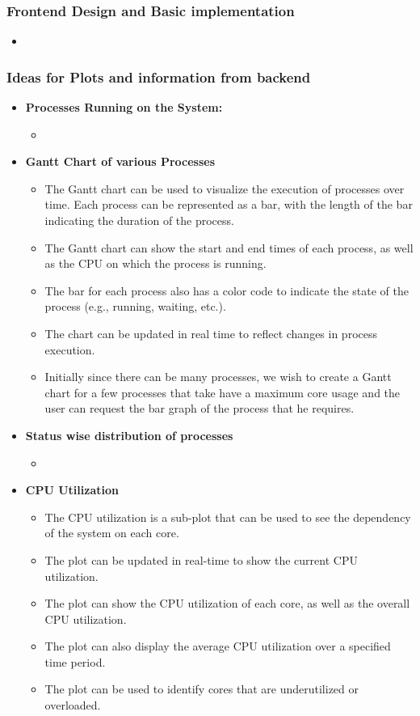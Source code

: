 \documentclass[12pt]{article}
\begin{document}
\subsubsection{Frontend Design and Basic implementation}
\begin{itemize}
    \item
\end{itemize}
\subsubsection{Ideas for Plots and information from backend}
\begin{itemize}
    \item {\bf Processes Running on the System:}
    \begin{itemize}
        \item
    \end{itemize}
    \item {\bf Gantt Chart of various Processes}
    \begin{itemize}
        \item The Gantt chart can be used to visualize the execution of processes over time. Each process can be represented as a bar, with the length of the bar indicating the duration of the process.
        \item The Gantt chart can show the start and end times of each process, as well as the CPU on which the process is running.
        \item The bar for each process also has a color code to indicate the state of the process (e.g., running, waiting, etc.).
        \item The chart can be updated in real time to reflect changes in process execution.
        \item Initially since there can be many processes, we wish to create a Gantt chart for a few processes that take have a maximum core usage and the user can request the bar graph of the process that he requires.
    \end{itemize}
    \item {\bf Status wise distribution of processes}
    \begin{itemize}
        \item
    \end{itemize}
    \item {\bf CPU Utilization}
    \begin{itemize}
        \item The CPU utilization is a sub-plot that can be used to see the dependency of the system on each core.
        \item The plot can be updated in real-time to show the current CPU utilization.
        \item The plot can show the CPU utilization of each core, as well as the overall CPU utilization.
        \item The plot can also display the average CPU utilization over a specified time period.
        \item The plot can be used to identify cores that are underutilized or overloaded.
    \end{itemize}
\end{itemize}
\end{document}
